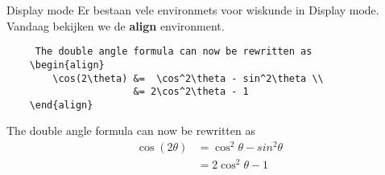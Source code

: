 \copyrightTim

\begin{frame}[fragile]{Display mode}
    Er bestaan vele environmets voor wiskunde in Display mode. Vandaag bekijken we de \textbf{align} environment.

    \begin{verbatim}
     The double angle formula can now be rewritten as   
    \begin{align}
        \cos(2\theta) &=  \cos^2\theta - sin^2\theta \\
                      &= 2\cos^2\theta - 1 
    \end{align}
\end{verbatim}
The double angle formula can now be rewritten as
    \begin{align}
        \cos(2\theta) &=  \cos^2\theta - sin^2\theta \\
                      &= 2\cos^2\theta - 1 
    \end{align}


\end{frame}